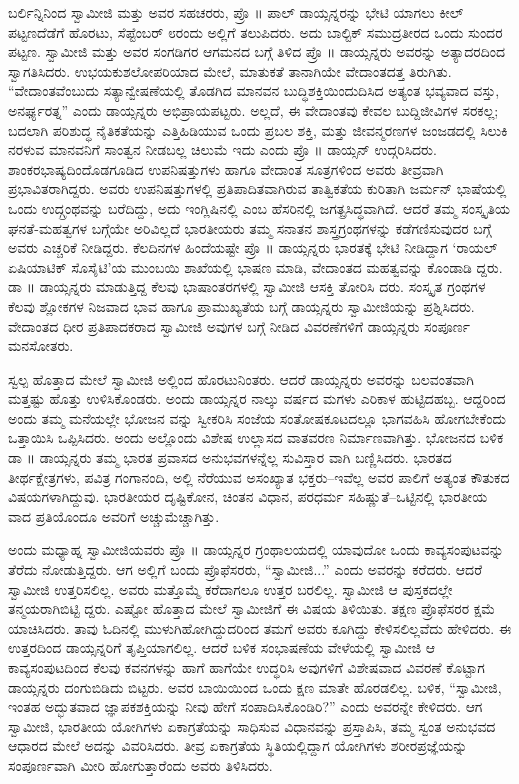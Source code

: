 ಬರ್ಲಿನ್ನಿನಿಂದ ಸ್ವಾಮೀಜಿ ಮತ್ತು ಅವರ ಸಹಚರರು, ಪ್ರೊ ॥ ಪಾಲ್ ಡಾಯ್ಸನ್ನರನ್ನು ಭೇಟಿ ಯಾಗಲು ಕೀಲ್ ಪಟ್ಟಣದೆಡೆಗೆ ಹೊರಟು, ಸೆಪ್ಟೆಂಬರ್ ೮ರಂದು ಅಲ್ಲಿಗೆ ತಲುಪಿದರು. ಅದು ಬಾಲ್ಟಿಕ್ ಸಮುದ್ರತೀರದ ಒಂದು ಸುಂದರ ಪಟ್ಟಣ. ಸ್ವಾಮೀಜಿ ಮತ್ತು ಅವರ ಸಂಗಡಿಗರ ಆಗಮನದ ಬಗ್ಗೆ ತಿಳಿದ ಪ್ರೊ ॥ ಡಾಯ್ಸನ್ನರು ಅವರನ್ನು ಅತ್ಯಾದರದಿಂದ ಸ್ವಾಗತಿಸಿದರು. ಉಭಯಕುಶಲೋಪರಿಯಾದ ಮೇಲೆ, ಮಾತುಕತೆ ತಾನಾಗಿಯೇ ವೇದಾಂತದತ್ತ ತಿರುಗಿತು. “ವೇದಾಂತವೆಂಬುದು ಸತ್ಯಾನ್ವೇಷಣೆಯಲ್ಲಿ ತೊಡಗಿದ ಮಾನವನ ಬುದ್ಧಿಶಕ್ತಿಯಿಂದುದಿಸಿದ ಅತ್ಯಂತ ಭವ್ಯವಾದ ವಸ್ತು, ಅನರ್ಘ್ಯರತ್ನ” ಎಂದು ಡಾಯ್ಸನ್ನರು ಅಭಿಪ್ರಾಯಪಟ್ಟರು. ಅಲ್ಲದೆ, ಈ ವೇದಾಂತವು ಕೇವಲ ಬುದ್ದಿಜೀವಿಗಳ ಸರಕಲ್ಲ; ಬದಲಾಗಿ ಪರಿಶುದ್ಧ ನೈತಿಕತೆಯನ್ನು ಎತ್ತಿಹಿಡಿಯುವ ಒಂದು ಪ್ರಬಲ ಶಕ್ತಿ, ಮತ್ತು ಜೀವನ್ಮರಣಗಳ ಜಂಜಡದಲ್ಲಿ ಸಿಲುಕಿ ನರಳುವ ಮಾನವನಿಗೆ ಸಾಂತ್ವನ ನೀಡಬಲ್ಲ ಚಿಲುಮೆ ಇದು ಎಂದು ಪ್ರೊ ॥ ಡಾಯ್ಸನ್ ಉದ್ಗರಿಸಿದರು. ಶಾಂಕರಭಾಷ್ಯದಿಂದೊಡಗೂಡಿದ ಉಪನಿಷತ್ತುಗಳು ಹಾಗೂ ವೇದಾಂತ ಸೂತ್ರಗಳಿಂದ ಅವರು ತೀವ್ರವಾಗಿ ಪ್ರಭಾವಿತರಾಗಿದ್ದರು. ಅವರು ಉಪನಿಷತ್ತುಗಳಲ್ಲಿ ಪ್ರತಿಪಾದಿತವಾಗಿರುವ ತಾತ್ವಿಕತೆಯ ಕುರಿತಾಗಿ ಜರ್ಮನ್ ಭಾಷೆಯಲ್ಲಿ ಒಂದು ಉದ್ಗ್ರಂಥವನ್ನು ಬರೆದಿದ್ದು, ಅದು ಇಂಗ್ಲಿಷಿನಲ್ಲಿ  ಎಂಬ ಹೆಸರಿನಲ್ಲಿ ಜಗತ್ಪ್ರಸಿದ್ಧವಾಗಿದೆ. ಆದರೆ ತಮ್ಮ ಸಂಸ್ಕೃತಿಯ ಘನತೆ-ಮಹತ್ವಗಳ ಬಗ್ಗೆಯೇ ಅರಿವಿಲ್ಲದೆ ಭಾರತೀಯರು ತಮ್ಮ ಸನಾತನ ಶಾಸ್ತ್ರಗ್ರಂಥಗಳನ್ನು ಕಡೆಗಣಿಸುವುದರ ಬಗ್ಗೆ ಅವರು ಎಚ್ಚರಿಕೆ ನೀಡಿದ್ದರು. ಕೆಲದಿನಗಳ ಹಿಂದೆಯಷ್ಟೇ ಪ್ರೊ ॥ ಡಾಯ್ಸನ್ನರು ಭಾರತಕ್ಕೆ ಭೇಟಿ ನೀಡಿದ್ದಾಗ ‘ರಾಯಲ್ ಏಷಿಯಾಟಿಕ್ ಸೊಸೈಟಿ’ಯ ಮುಂಬಯಿ ಶಾಖೆಯಲ್ಲಿ ಭಾಷಣ ಮಾಡಿ, ವೇದಾಂತದ ಮಹತ್ವವನ್ನು ಕೊಂಡಾಡಿ ದ್ದರು. ಡಾ ॥ ಡಾಯ್ಸನ್ನರು ಮಾಡುತ್ತಿದ್ದ ಕೆಲವು ಭಾಷಾಂತರಗಳಲ್ಲಿ ಸ್ವಾಮೀಜಿ ಆಸಕ್ತಿ ತೋರಿಸಿ ದರು. ಸಂಸ್ಕೃತ ಗ್ರಂಥಗಳ ಕೆಲವು ಶ್ಲೋಕಗಳ ನಿಜವಾದ ಭಾವ ಹಾಗೂ ಪ್ರಾಮುಖ್ಯತೆಯ ಬಗ್ಗೆ ಡಾಯ್ಸನ್ನರು ಸ್ವಾಮೀಜಿಯನ್ನು ಪ್ರಶ್ನಿಸಿದರು. ವೇದಾಂತದ ಧೀರ ಪ್ರತಿಪಾದಕರಾದ ಸ್ವಾಮೀಜಿ ಅವುಗಳ ಬಗ್ಗೆ ನೀಡಿದ ವಿವರಣೆಗಳಿಗೆ ಡಾಯ್ಸನ್ನರು ಸಂಪೂರ್ಣ ಮನಸೋತರು.

ಸ್ವಲ್ಪ ಹೊತ್ತಾದ ಮೇಲೆ ಸ್ವಾಮೀಜಿ ಅಲ್ಲಿಂದ ಹೊರಟುನಿಂತರು. ಆದರೆ ಡಾಯ್ಸನ್ನರು ಅವರನ್ನು ಬಲವಂತವಾಗಿ ಮತ್ತಷ್ಟು ಹೊತ್ತು ಉಳಿಸಿಕೊಂಡರು. ಅಂದು ಡಾಯ್ಸನ್ನರ ನಾಲ್ಕು ವರ್ಷದ ಮಗಳು ಎರಿಕಾಳ ಹುಟ್ಟಿದಹಬ್ಬ. ಆದ್ದರಿಂದ ಅಂದು ತಮ್ಮ ಮನೆಯಲ್ಲೇ ಭೋಜನ ವನ್ನು ಸ್ವೀಕರಿಸಿ ಸಂಜೆಯ ಸಂತೋಷಕೂಟದಲ್ಲೂ ಭಾಗವಹಿಸಿ ಹೋಗಬೇಕೆಂದು ಒತ್ತಾಯಿಸಿ ಒಪ್ಪಿಸಿದರು. ಅಂದು ಅಲ್ಲೊಂದು ವಿಶೇಷ ಉಲ್ಲಾಸದ ವಾತವರಣ ನಿರ್ಮಾಣವಾಗಿತ್ತು. ಭೋಜನದ ಬಳಿಕ ಡಾ ॥ ಡಾಯ್ಸನ್ನರು ತಮ್ಮ ಭಾರತ ಪ್ರವಾಸದ ಅನುಭವಗಳನ್ನೆಲ್ಲ ಸುವಿಸ್ತಾರ ವಾಗಿ ಬಣ್ಣಿಸಿದರು. ಭಾರತದ ತೀರ್ಥಕ್ಷೇತ್ರಗಳು, ಪವಿತ್ರ ಗಂಗಾನಂದಿ, ಅಲ್ಲಿ ನೆರೆಯುವ ಅಸಂಖ್ಯಾತ ಭಕ್ತರು–ಇವೆಲ್ಲ ಅವರ ಪಾಲಿಗೆ ಅತ್ಯಂತ ಕೌತುಕದ ವಿಷಯಗಳಾಗಿದ್ದುವು. ಭಾರತೀಯರ ದೃಷ್ಟಿಕೋನ, ಚಿಂತನ ವಿಧಾನ, ಪರಧರ್ಮ ಸಹಿಷ್ಣುತೆ–ಒಟ್ಟಿನಲ್ಲಿ ಭಾರತೀಯ ವಾದ ಪ್ರತಿಯೊಂದೂ ಅವರಿಗೆ ಅಚ್ಚುಮೆಚ್ಚಾಗಿತ್ತು.

ಅಂದು ಮಧ್ಯಾಹ್ನ ಸ್ವಾಮೀಜಿಯವರು ಪ್ರೊ ॥ ಡಾಯ್ಸನ್ನರ ಗ್ರಂಥಾಲಯದಲ್ಲಿ ಯಾವುದೋ ಒಂದು ಕಾವ್ಯಸಂಪುಟವನ್ನು ತೆರೆದು ನೋಡುತ್ತಿದ್ದರು. ಆಗ ಅಲ್ಲಿಗೆ ಬಂದು ಪ್ರೊಫೆಸರರು, “ಸ್ವಾಮೀಜಿ...” ಎಂದು ಅವರನ್ನು ಕರೆದರು. ಆದರೆ ಸ್ವಾಮೀಜಿ ಉತ್ತರಿಸಲಿಲ್ಲ. ಅವರು ಮತ್ತೊಮ್ಮೆ ಕರೆದಾಗಲೂ ಉತ್ತರ ಬರಲಿಲ್ಲ. ಸ್ವಾಮೀಜಿ ಆ ಪುಸ್ತಕದಲ್ಲೇ ತನ್ಮಯರಾಗಿಬಿಟ್ಟಿ ದ್ದರು. ಎಷ್ಟೋ ಹೊತ್ತಾದ ಮೇಲೆ ಸ್ವಾಮೀಜಿಗೆ ಈ ವಿಷಯ ತಿಳಿಯಿತು. ತಕ್ಷಣ ಪ್ರೊಫೆಸರರ ಕ್ಷಮೆ ಯಾಚಿಸಿದರು. ತಾವು ಓದಿನಲ್ಲಿ ಮುಳುಗಿಹೋಗಿದ್ದುದರಿಂದ ತಮಗೆ ಅವರು ಕೂಗಿದ್ದು ಕೇಳಿಸಲಿಲ್ಲವೆದು ಹೇಳಿದರು. ಈ ಉತ್ತರದಿಂದ ಡಾಯ್ಸನ್ನರಿಗೆ ತೃಪ್ತಿಯಾಗಲಿಲ್ಲ. ಆದರೆ ಬಳಿಕ ಸಂಭಾಷಣೆಯ ವೇಳೆಯಲ್ಲಿ ಸ್ವಾಮೀಜಿ ಆ ಕಾವ್ಯಸಂಪುಟದಿಂದ ಕೆಲವು ಕವನಗಳನ್ನು ಹಾಗೆ ಹಾಗೆಯೇ ಉದ್ಧರಿಸಿ ಅವುಗಳಿಗೆ ವಿಶೇಷವಾದ ವಿವರಣೆ ಕೊಟ್ಟಾಗ ಡಾಯ್ಸನ್ನರು ದಂಗುಬಿಡಿದು ಬಿಟ್ಟರು. ಅವರ ಬಾಯಿಯಿಂದ ಒಂದು ಕ್ಷಣ ಮಾತೇ ಹೊರಡಲಿಲ್ಲ. ಬಳಿಕ, “ಸ್ವಾಮೀಜಿ, ಇಂತಹ ಅದ್ಭುತವಾದ ಜ್ಞಾಪಕಶಕ್ತಿಯನ್ನು ನೀವು ಹೇಗೆ ಸಂಪಾದಿಸಿಕೊಂಡಿರಿ?” ಎಂದು ಅವರನ್ನೇ ಕೇಳಿದರು. ಆಗ ಸ್ವಾಮೀಜಿ, ಭಾರತೀಯ ಯೋಗಿಗಳು ಏಕಾಗ್ರತೆಯನ್ನು ಸಾಧಿಸುವ ವಿಧಾನವನ್ನು ಪ್ರಸ್ತಾಪಿಸಿ, ತಮ್ಮ ಸ್ವಂತ ಅನುಭವದ ಆಧಾರದ ಮೇಲೆ ಅದನ್ನು ವಿವರಿಸಿದರು. ತೀವ್ರ ಏಕಾಗ್ರತೆಯ ಸ್ಥಿತಿಯಲ್ಲಿದ್ದಾಗ ಯೋಗಿಗಳು ಶರೀರಪ್ರಜ್ಞೆಯನ್ನು ಸಂಪೂರ್ಣವಾಗಿ ಮೀರಿ ಹೋಗುತ್ತಾರೆಂದು ಅವರು ತಿಳಿಸಿದರು.

